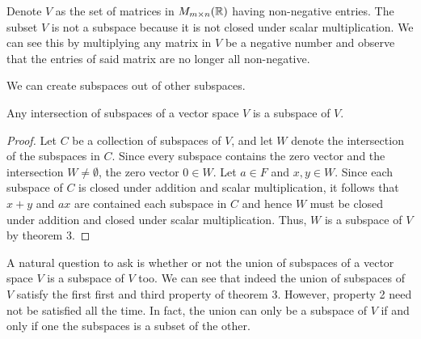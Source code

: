 \begin{eg}
   Denote \( V  \) as the set of matrices in \( M_{m \times n}(\mathbb{R} ) \) having non-negative entries. The subset \( V  \) is not a subspace because it is not closed under scalar multiplication. We can see this by multiplying any matrix in \( V  \) be a negative number and observe that the entries of said matrix are no longer all non-negative.  
\end{eg}

We can create subspaces out of other subspaces.


\begin{theorem}
   Any intersection of subspaces of a vector space \( V  \) is a subspace of \( V  \).
\end{theorem}

\begin{proof}
Let \( C  \) be a collection of subspaces of \( V  \), and let \( W  \) denote the intersection of the subspaces in \( C  \). Since every subspace contains the zero vector and the intersection \( W  \neq \emptyset  \), the zero vector \( 0 \in W  \). Let \( a \in F  \) and \( x,y \in W  \). Since each subspace of \( C  \) is closed under addition and scalar multiplication, it follows that \( x + y  \) and \( ax  \) are contained each subspace in \( C  \) and hence \(W   \) must be closed under addition and closed under scalar multiplication. Thus, \( W  \) is a subspace of \( V  \) by theorem 3.
\end{proof}

A natural question to ask is whether or not the union of subspaces of a vector space \( V  \) is a subspace of \( V  \) too. We can see that indeed the union of subspaces of \( V  \) satisfy the first first and third property of theorem 3. However, property 2 need not be satisfied all the time. In fact, the union can only be a subspace of \( V  \) if and only if one the subspaces is a subset of the other.


